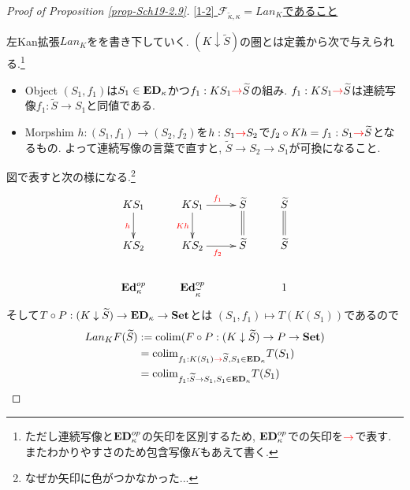 \documentclass[dvipdfmx,a4paper,11pt]{article}
\newcommand{\colim}{{\rm colim}}
\theoremstyle{definition}
\newcommand{\xr}[1]{\textcolor{red}{#1}}
\begin{document}
\begin{proof}[Proof of Proposition \ref{prop-Sch19-2.9}]
\underline{[1-2] $\mathcal{F}_{\widetilde{\kappa}, \kappa} = Lan_{K}$であること}

左Kan拡張$Lan_{K}$をを書き下していく. 
$ (K \downarrow \widetilde{S})$の圏とは定義から次で与えられる.\footnote{ただし連続写像と${\bf ED}_{\kappa}^{op}$の矢印を区別するため, ${\bf ED}_{\kappa}^{op}$での矢印を$\xr{\to}$で表す. またわかりやすさのため包含写像$K$もあえて書く.}
\begin{itemize}
\item Object $(S_1, f_1)$は$S_1 \in {\bf ED}_{\kappa}$かつ$f_1: KS_1 \xr{\to} \widetilde{S}$の組み.
$f_1: KS_1 \xr{\to} \widetilde{S}$は連続写像$f_1 : \widetilde{S} \to S_1$と同値である. 
\item Morpshim $h : (S_1, f_1) \to (S_2, f_2)$を$h : S_1 \xr{\to} S_2$で$f_2 \circ Kh = f_1  : S_1 \xr{\to} \widetilde{S}$となるもの. 
よって連続写像の言葉で直すと, $\widetilde{S} \to S_2 \to S_1$が可換になること. 
\end{itemize}
 図で表すと次の様になる.\footnote{なぜか矢印に色がつかなかった...}
\begin{equation*}
\xymatrix@C=25pt@R=20pt{
KS_1\ar@{->}[d] _{\xr{h}}
&KS_1\ar@{->}[d]_{\xr{Kh}}  \ar@{->}[r]^{\xr{f_1}} 
& \widetilde{S}\ar@{=}[d]
&\widetilde{S}\ar@{=}[d]
\\
KS_2
&KS_2 \ar@{->}[r]_{\xr{f_2}} 
&\widetilde{S}
&\widetilde{S}
 \\   
{\bf Ed}_{\kappa}^{op}
&{\bf Ed}_{\widetilde{\kappa}}^{op}
&
&1 
\\   
}
\end{equation*}
そして$T \circ P : (K \downarrow \widetilde{S}) \to {\bf ED}_{\kappa} \to {\bf Set}$とは
$(S_1, f_1) \mapsto T(K(S_1))$であるので
\begin{align*}
\begin{split}
Lan_{K}F (\widetilde{S})
&:=
\colim(F \circ P : (K \downarrow \widetilde{S}) \to P \to {\bf Set})\\
&=
\colim_{f_1: K(S_1) \xr{\to} \widetilde{S}, S_1 \in  {\bf ED}_{\kappa} }T(S_1)\\
&=
\colim_{f_1 : \widetilde{S} \to S_1, S_1 \in  {\bf ED}_{\kappa}}T(S_1) \\
\end{split}
\end{align*}


\end{proof}
\end{document}
